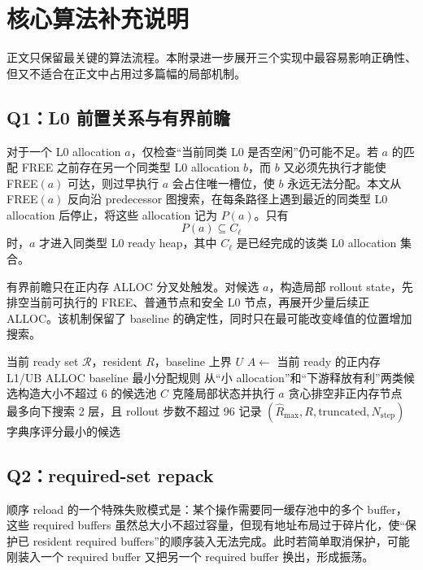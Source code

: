 \section{核心算法补充说明}

正文只保留最关键的算法流程。本附录进一步展开三个实现中最容易影响正确性、但又不适合在正文中占用过多篇幅的局部机制。

\subsection{Q1：L0 前置关系与有界前瞻}

对于一个 L0 allocation $a$，仅检查“当前同类 L0 是否空闲”仍可能不足。若 $a$ 的匹配 FREE 之前存在另一个同类型 L0 allocation $b$，而 $b$ 又必须先执行才能使 FREE$(a)$ 可达，则过早执行 $a$ 会占住唯一槽位，使 $b$ 永远无法分配。本文从 FREE$(a)$ 反向沿 predecessor 图搜索，在每条路径上遇到最近的同类型 L0 allocation 后停止，将这些 allocation 记为 $P(a)$。只有
\[
P(a)\subseteq C_{\ell}
\]
时，$a$ 才进入同类型 L0 ready heap，其中 $C_{\ell}$ 是已经完成的该类 L0 allocation 集合。

有界前瞻只在正内存 ALLOC 分叉处触发。对候选 $a$，构造局部 rollout state，先排空当前可执行的 FREE、普通节点和安全 L0 节点，再展开少量后续正 ALLOC。该机制保留了 baseline 的确定性，同时只在最可能改变峰值的位置增加搜索。

\begin{algorithm}[H]
\caption{Q1 正内存分叉的 bounded rollout}
\begin{algorithmic}[1]
\Require 当前 ready set $\mathcal R$，resident $R$，baseline 上界 $U$
\State $A\gets$ 当前 ready 的正内存 L1/UB ALLOC
    \State \Return baseline 最小分配规则
\EndIf
\State 从“小 allocation”和“下游释放有利”两类候选构造大小不超过 6 的候选池 $C$
    \State 克隆局部状态并执行 $a$
    \State 贪心排空非正内存节点
    \State 最多向下搜索 2 层，且 rollout 步数不超过 96
    \State 记录 $(\widehat R_{\max},R,\text{truncated},N_{\text{step}})$
\EndFor
\State \Return 字典序评分最小的候选
\end{algorithmic}
\end{algorithm}

\subsection{Q2：required-set repack}

顺序 reload 的一个特殊失败模式是：某个操作需要同一缓存池中的多个 buffer，这些 required buffers 虽然总大小不超过容量，但现有地址布局过于碎片化，使“保护已 resident required buffers”的顺序装入无法完成。此时若简单取消保护，可能刚装入一个 required buffer 又把另一个 required buffer 换出，形成振荡。

